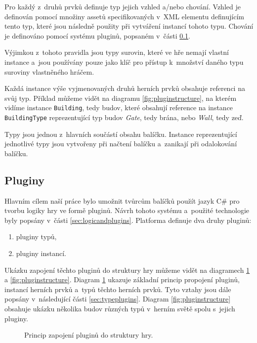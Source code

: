 Pro každý z~druhů prvků definuje typ jejich vzhled a/nebo chování. Vzhled je definován pomocí množiny assetů specifikovaných v~XML elementu definujícím tento typ, které jsou následně použity při vytváření instancí tohoto typu. Chování je definováno pomocí systému pluginů, popsaném v~části \ref{sec:plugins}. 

Výjimkou z~tohoto pravidla jsou typy surovin, které ve hře nemají vlastní instance a~jsou používány pouze jako klíč pro přístup k~množství daného typu suroviny vlastněného hráčem.

Každá instance výše vyjmenovaných druhů herních prvků obsahuje referenci na svůj typ. Příklad můžeme vidět na diagramu \ref{fig:pluginstructure}, na kterém vidíme instance \texttt{Building}, tedy budov, které obsahují reference na instance \texttt{BuildingType} reprezentující typ budov \textit{Gate}, tedy brána, nebo \textit{Wall}, tedy zeď.

Typy jsou jednou z~hlavních součástí obsahu balíčku. Instance reprezentující jednotlivé typy jsou vytvořeny při načtení balíčku a~zanikají při odalokování balíčku. 

\subsection{Pluginy}
\label{sec:plugins}
Hlavním cílem naší práce bylo umožnit tvůrcům balíčků použít jazyk C\# pro tvorbu logiky hry ve formě pluginů. Návrh tohoto systému a~použité technologie byly popsány v~části \ref{sec:logicandplugins}. Platforma definuje dva druhy pluginů:

\begin{enumerate}
	\item pluginy typů,
	\item pluginy instancí.
\end{enumerate}

Ukázku zapojení těchto pluginů do struktury hry můžeme vidět na diagramech \ref{fig:simplepluginstructure} a \ref{fig:pluginstructure}. Diagram \ref{fig:simplepluginstructure} ukazuje základní princip propojení pluginů, instancí herních prvků a~typů těchto herních prvků. Tyto vztahy jsou dále popsány v~následující části \ref{sec:typeplugins}. Diagram \ref{fig:pluginstructure} obsahuje ukázku několika budov různých typů v~herním světě spolu s~jejich pluginy.

\begin{figure}[h]
	\centering
	\fontsize{8pt}{11pt}\selectfont
	\def\svgwidth{\textwidth}
	
	\caption{Princip zapojení pluginů do struktury hry.}
	\label{fig:simplepluginstructure}
\end{figure}

